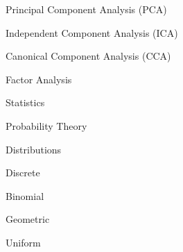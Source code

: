 \documentclass[11pt]{article}
\begin{document}
\begin{enumerate}
\begin{item}
\begin{enumerate}
          \begin{item}
            Principal Component Analysis (PCA)
          \end{item}

          \begin{item}
            Independent Component Analysis (ICA)
          \end{item}

          \begin{item}
            Canonical Component Analysis (CCA)
          \end{item}

          \begin{item}
            Factor Analysis
          \end{item}


      \end{enumerate}

    \end{item}

    \begin{item}

      Statistics

      \begin{enumerate}

          \begin{item}
            Probability Theory
          \end{item}

          \begin{item}

            Distributions

            \begin{enumerate}

                \begin{item}

                  Discrete

                  \begin{enumerate}

                      \begin{item}
                        Binomial
                      \end{item}

                      \begin{item}
                        Geometric
                      \end{item}

                      \begin{item}
                        Uniform
                      \end{item}


\end{enumerate}
\end{item}
\end{enumerate}
\end{item}
\end{enumerate}
\end{item}
\end{enumerate}
\end{document}

